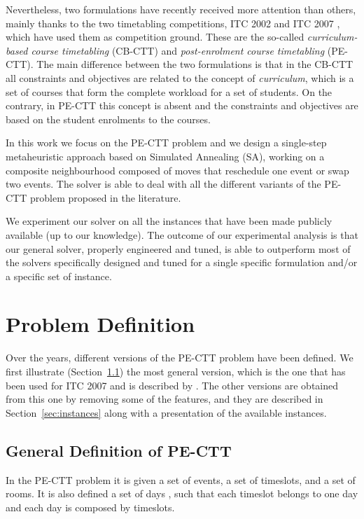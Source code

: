 \documentclass[authoryear,preprint,a4paper,12pt]{elsarticle}
\begin{document}
Nevertheless, two formulations have recently received more attention
than others, mainly thanks to the two timetabling competitions, ITC
2002 and ITC 2007 \citep{MSPM10}, which have used them as competition
ground.  These are the so-called \emph{curriculum-based course
  timetabling} (CB-CTT) and \emph{post-enrolment course timetabling}
(PE-CTT). The main difference between the two formulations is that in
the CB-CTT all constraints and objectives are related to the concept
of \emph{curriculum}, which is a set of courses that form the
complete workload for a set of students. On the contrary, in PE-CTT
this concept is absent and the constraints and objectives are based on
the student enrolments to the courses.

In this work we focus on the PE-CTT problem and we design a
single-step metaheuristic approach based on Simulated Annealing (SA),
working on a composite neighbourhood composed of moves that reschedule
one event or swap two events. The solver is able to deal with all the
different variants of the PE-CTT problem proposed in the literature.

We experiment our solver on all the instances that have been made
publicly available (up to our knowledge).  The outcome of our
experimental analysis is that our general solver, properly engineered
and tuned, is able to outperform most of the solvers specifically
designed and tuned for a single specific formulation and/or a specific
set of instance.

\section{Problem Definition}

Over the years, different versions of the PE-CTT problem have been
defined. We first illustrate (Section~\ref{sec:definition}) the most
general version, which is the one that has been used for ITC 2007
and is described by \citet{LePM07}.
The other versions are obtained from this one by removing some of the
features, and they are described in Section~\ref{sec:instances} along
with a presentation of the available instances.

\subsection{General Definition of PE-CTT}
\label{sec:definition}

In the PE-CTT problem it is given a set  of events, a set
 of timeslots, and a set  of rooms. It is
also defined a set of days , such that each timeslot
belongs to one day and each day is composed by
 timeslots.
\end{document}
